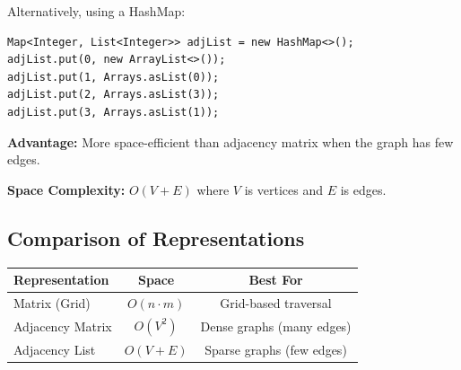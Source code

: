 Alternatively, using a HashMap:
\begin{verbatim}
Map<Integer, List<Integer>> adjList = new HashMap<>();
adjList.put(0, new ArrayList<>());
adjList.put(1, Arrays.asList(0));
adjList.put(2, Arrays.asList(3));
adjList.put(3, Arrays.asList(1));
\end{verbatim}

\textbf{Advantage:} More space-efficient than adjacency matrix when the graph has few edges.

\textbf{Space Complexity:} $O(V + E)$ where $V$ is vertices and $E$ is edges.

\subsection{Comparison of Representations}

\begin{center}
\begin{tabular}{l c c}
\toprule
\textbf{Representation} & \textbf{Space} & \textbf{Best For} \\
\midrule
Matrix (Grid) & $O(n \cdot m)$ & Grid-based traversal \\
Adjacency Matrix & $O(V^2)$ & Dense graphs (many edges) \\
Adjacency List & $O(V + E)$ & Sparse graphs (few edges) \\
\bottomrule
\end{tabular}
\end{center}